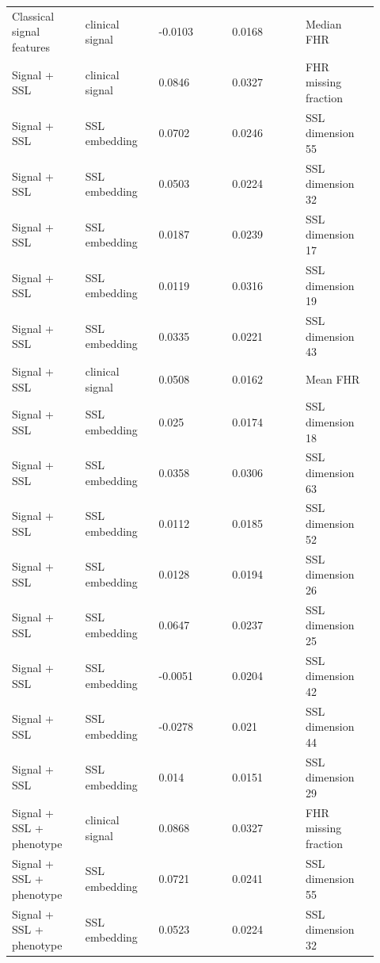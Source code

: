 \documentclass[11pt]{article}
\begin{document}
\begin{landscape}
\begin{longtable}{L{0.184\linewidth} L{0.184\linewidth} L{0.184\linewidth} L{0.184\linewidth} L{0.184\linewidth}}
Classical signal features & clinical signal & -\allowbreak{}0.\allowbreak{}0103 & 0.\allowbreak{}0168 & Median FHR \\
Signal + SSL & clinical signal & 0.\allowbreak{}0846 & 0.\allowbreak{}0327 & FHR missing fraction \\
Signal + SSL & SSL embedding & 0.\allowbreak{}0702 & 0.\allowbreak{}0246 & SSL dimension 55 \\
Signal + SSL & SSL embedding & 0.\allowbreak{}0503 & 0.\allowbreak{}0224 & SSL dimension 32 \\
Signal + SSL & SSL embedding & 0.\allowbreak{}0187 & 0.\allowbreak{}0239 & SSL dimension 17 \\
Signal + SSL & SSL embedding & 0.\allowbreak{}0119 & 0.\allowbreak{}0316 & SSL dimension 19 \\
Signal + SSL & SSL embedding & 0.\allowbreak{}0335 & 0.\allowbreak{}0221 & SSL dimension 43 \\
Signal + SSL & clinical signal & 0.\allowbreak{}0508 & 0.\allowbreak{}0162 & Mean FHR \\
Signal + SSL & SSL embedding & 0.\allowbreak{}025 & 0.\allowbreak{}0174 & SSL dimension 18 \\
Signal + SSL & SSL embedding & 0.\allowbreak{}0358 & 0.\allowbreak{}0306 & SSL dimension 63 \\
Signal + SSL & SSL embedding & 0.\allowbreak{}0112 & 0.\allowbreak{}0185 & SSL dimension 52 \\
Signal + SSL & SSL embedding & 0.\allowbreak{}0128 & 0.\allowbreak{}0194 & SSL dimension 26 \\
Signal + SSL & SSL embedding & 0.\allowbreak{}0647 & 0.\allowbreak{}0237 & SSL dimension 25 \\
Signal + SSL & SSL embedding & -\allowbreak{}0.\allowbreak{}0051 & 0.\allowbreak{}0204 & SSL dimension 42 \\
Signal + SSL & SSL embedding & -\allowbreak{}0.\allowbreak{}0278 & 0.\allowbreak{}021 & SSL dimension 44 \\
Signal + SSL & SSL embedding & 0.\allowbreak{}014 & 0.\allowbreak{}0151 & SSL dimension 29 \\
Signal + SSL + phenotype & clinical signal & 0.\allowbreak{}0868 & 0.\allowbreak{}0327 & FHR missing fraction \\
Signal + SSL + phenotype & SSL embedding & 0.\allowbreak{}0721 & 0.\allowbreak{}0241 & SSL dimension 55 \\
Signal + SSL + phenotype & SSL embedding & 0.\allowbreak{}0523 & 0.\allowbreak{}0224 & SSL dimension 32 \\

\end{longtable}
\end{landscape}
\end{document}
